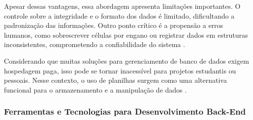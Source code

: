 Apesar dessas vantagens, essa abordagem apresenta limitações importantes. O controle sobre a integridade e o formato dos dados é limitado, dificultando a padronização das informações. Outro ponto crítico é a propensão a erros humanos, como sobrescrever células por engano ou registrar dados em estruturas inconsistentes, comprometendo a confiabilidade do sistema \cite{wisconsin2020}.

Considerando que muitas soluções para gerenciamento de banco de dados exigem hospedagem paga, isso pode se tornar inacessível para projetos estudantis ou pessoais. Nesse contexto, o uso de planilhas surgem como uma alternativa funcional para o armazenamento e a manipulação de dados \cite{ufsm2024}.

\subsubsection{Ferramentas e Tecnologias para Desenvolvimento Back-End}

